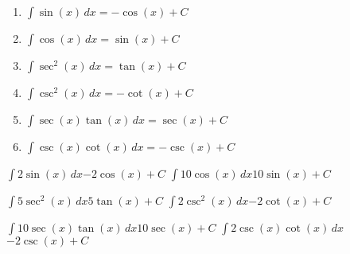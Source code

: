 

\newpage
\begin{myframe}[arc=10pt,auto outer arc]
	\begin{enumerate}
		\item $\displaystyle \int \sin{(x)} \,dx = -\cos{(x)} + C$
		\item $\displaystyle \int \cos{(x)} \,dx = \sin{(x)} + C$
		\item $\displaystyle \int \sec^2{(x)} \,dx = \tan{(x)} + C$
		\item $\displaystyle \int \csc^2{(x)} \,dx = -\cot{(x)} + C$
		\item $\displaystyle \int \sec{(x)} \tan{(x)} \,dx = \sec{(x)} + C$
		\item $\displaystyle \int \csc{(x)} \cot{(x)} \,dx = -\csc{(x)} + C$
	\end{enumerate}
\end{myframe}


\pairofprobsans%
{$\displaystyle \int 2\sin{(x)} \,dx$}{$\displaystyle -2\cos{(x)} + C$}%
{$\displaystyle \int 10\cos{(x)} \,dx$}{$\displaystyle 10\sin{(x)} + C$}%

\pairofprobsans%
{$\displaystyle \int 5\sec^2{(x)} \,dx$}{$\displaystyle 5\tan{(x)} + C$}%
{$\displaystyle \int 2\csc^2{(x)} \,dx$}{$\displaystyle -2\cot{(x)} + C$}%


\pairofprobsans%
{$\displaystyle \int 10 \sec{(x)} \tan{(x)} \,dx$}{$\displaystyle 10\sec{(x)} + C$}%
{$\displaystyle \int 2\csc{(x)} \cot{(x)} \,dx$}{$\displaystyle -2\csc{(x)} + C$}%

